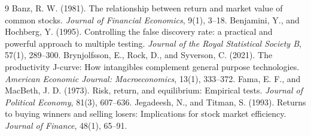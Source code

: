 \documentclass[11pt]{article}
\begin{document}
\begin{thebibliography}{9}
\small
{} Banz, R. W. (1981). The relationship between
return and market value of common stocks. \emph{Journal of Financial
Economics}, 9(1), 3--18.
 Benjamini, Y., and Hochberg, Y.
(1995). Controlling the false discovery rate: a practical and powerful approach
to multiple testing. \emph{Journal of the Royal Statistical Society B}, 57(1),
289--300.
 Brynjolfsson, E., Rock,
D., and Syverson, C. (2021). The productivity J-curve: How intangibles
complement general purpose technologies. \emph{American Economic Journal:
Macroeconomics}, 13(1), 333--372.
 Fama, E. F., and MacBeth,
J. D. (1973). Risk, return, and equilibrium: Empirical tests. \emph{Journal of
Political Economy}, 81(3), 607--636.
 Jegadeesh, N., and Titman, S.
(1993). Returns to buying winners and selling losers: Implications for stock
market efficiency. \emph{Journal of Finance}, 48(1), 65--91.
\end{thebibliography}
\end{document}
